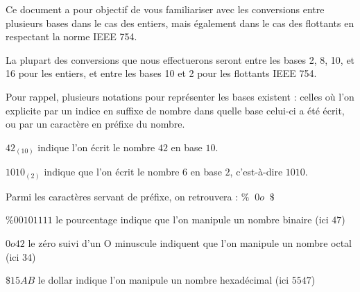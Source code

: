 \documentclass[11pt,a4paper]{article}
\begin{document}
\EncadreTitre

\bigskip


%
%

\bigskip


Ce document a pour objectif de vous familiariser avec les conversions entre plusieurs bases dans le cas des entiers, mais également dans le cas des flottants en respectant la norme IEEE 754.

\bigskip

La plupart des conversions que nous effectuerons seront entre les bases 2, 8, 10, et 16 pour les entiers, et entre les bases 10 et 2 pour les flottants IEEE 754.

Pour rappel, plusieurs notations pour représenter les bases existent : celles où l'on explicite par un indice en suffixe de nombre dans quelle base celui-ci a été écrit, ou par un caractère en préfixe du nombre.

$ 42_{(10)} $ indique l'on écrit le nombre \og $42$ \fg{} en base $ 10 $.

$ 1010_{(2)} $ indique que l'on écrit le nombre \og $6$ \fg{} en base $ 2 $, c'est-à-dire $ 1010 $.

\medskip

Parmi les caractères servant de préfixe, on retrouvera : $ \%   \; \;  0o  \; \;  \$  $

$ \% 00101111 $ le pourcentage indique que l'on manipule un nombre binaire (ici $ 47 $)

$ 0o 42 $ le zéro suivi d'un O minuscule indiquent que l'on manipule un nombre octal (ici $ 34 $)

$ \$ 15AB $ le dollar indique l'on manipule un nombre hexadécimal (ici $ 5547 $)
\end{document}
